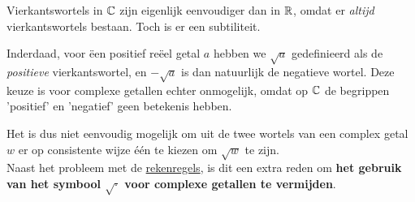 \documentclass{ximera}
\begin{document}
    \begin{remark}
        Vierkantswortels in $\mathbb{C}$ zijn eigenlijk eenvoudiger dan in $\mathbb{R}$, omdat er \textit{altijd} vierkantswortels bestaan.
        Toch is er een subtiliteit.

        Inderdaad, voor ëen positief reëel getal $a$ hebben we $\sqrt{a}$ gedefinieerd als de \textit{positieve} vierkantswortel, en $-\sqrt{a}$ is dan natuurlijk de negatieve wortel.
        Deze keuze is voor complexe getallen echter onmogelijk, omdat op $\mathbb{C}$ de begrippen 'positief' en 'negatief' geen betekenis hebben.

        Het is dus niet eenvoudig mogelijk om uit de twee wortels van een complex getal $w$ er op consistente wijze één te kiezen om $\sqrt{w}$ te zijn.
        \\
        Naast het probleem met de \hyperref[eig:geen_wortelteken_voor_complexe_getallen]{rekenregels}, is dit een extra reden om \textbf{het gebruik van het symbool $\sqrt{\cdot}$ voor complexe getallen te vermijden}.

    \end{remark}
\end{document}
